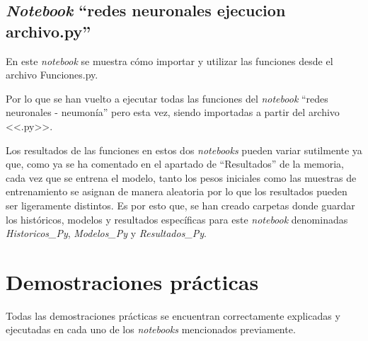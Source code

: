 \subsection{\textit{Notebook} ``redes neuronales ejecucion archivo.py''} 

En este \textit{notebook} se muestra cómo importar y utilizar las funciones desde el archivo Funciones.py.

Por lo que se han vuelto a ejecutar todas las funciones del \textit{notebook} ``redes neuronales - neumonía'' pero esta vez, siendo importadas a partir del archivo <<.py>>.

Los resultados de las funciones en estos dos \textit{notebooks} pueden variar sutilmente ya que, como ya se ha comentado en el apartado de ``Resultados'' de la memoria, cada vez que se entrena el modelo, tanto los pesos iniciales como las muestras de entrenamiento se asignan de manera aleatoria por lo que los resultados pueden ser ligeramente distintos. Es por esto que, se han creado carpetas donde guardar los históricos, modelos y resultados específicas para este \textit{notebook} denominadas\textit{ Historicos\_Py}, \textit{Modelos\_Py} y \textit{Resultados\_Py}.


\section{Demostraciones prácticas}

Todas las demostraciones prácticas se encuentran correctamente explicadas y ejecutadas en cada uno de los \textit{notebooks} mencionados previamente.





    
     